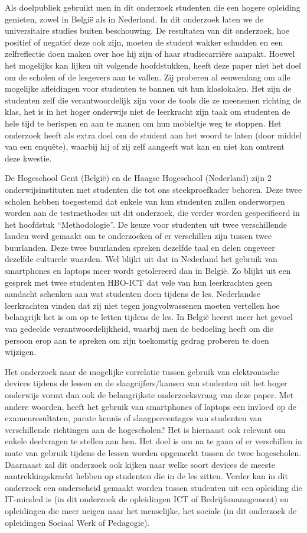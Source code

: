 Als doelpubliek gebruikt men in dit onderzoek studenten die een hogere opleiding genieten, zowel in België als in Nederland. In dit onderzoek laten we de universitaire studies buiten beschouwing. De resultaten van dit onderzoek, hoe positief of negatief deze ook zijn, moeten de student wakker schudden en een zelfreflectie doen maken over hoe hij zijn of haar studiecarrière aanpakt. Hoewel het mogelijks kan lijken uit volgende hoofdstukken, heeft deze paper niet het doel om de scholen of de lesgevers aan te vallen. Zij proberen al eeuwenlang om alle mogelijke afleidingen voor studenten te bannen uit hun klaslokalen. Het zijn de studenten zelf die verantwoordelijk zijn voor de tools die ze meenemen richting de klas, het is in het hoger onderwijs niet de leerkracht zijn taak om studenten de hele tijd te berispen en aan te manen om hun mobieltje weg te stoppen. Het onderzoek heeft als extra doel om de student aan het woord te laten (door middel van een enquête), waarbij hij of zij zelf aangeeft wat kan en niet kan omtrent deze kwestie.

De Hogeschool Gent (België) en de Haagse Hogeschool (Nederland) zijn 2 onderwijsinstituten met studenten die tot ons steekproefkader behoren. Deze twee scholen hebben toegestemd dat enkele van hun studenten zullen onderworpen worden aan de testmethodes uit dit onderzoek, die verder worden gespecifieerd in het hoofdstuk “Methodologie”. De keuze voor studenten uit twee verschillende landen werd gemaakt om te onderzoeken of er verschillen zijn tussen twee buurlanden. Deze twee buurlanden spreken dezelfde taal en delen ongeveer dezelfde culturele waarden. Wel blijkt uit \textcite{VanGaalen2017} dat in Nederland het gebruik van smartphones en laptops meer wordt getolereerd dan in België. Zo blijkt uit een gesprek met twee studenten HBO-ICT dat vele van hun leerkrachten geen aandacht schenken aan wat studenten doen tijdens de les. Nederlandse leerkrachten vinden dat zij niet tegen jongvolwassenen moeten vertellen hoe belangrijk het is om op te letten tijdens de les. In België heerst meer het gevoel van gedeelde verantwoordelijkheid, waarbij men de bedoeling heeft om die persoon erop aan te spreken om zijn toekomstig gedrag proberen te doen wijzigen.

Het onderzoek naar de mogelijke correlatie tussen gebruik van elektronische devices tijdens de lessen en de slaagcijfers/kansen van studenten uit het hoger onderwijs vormt dan ook de belangrijkste onderzoeksvraag van deze paper. Met andere woorden, heeft het gebruik van smartphones of laptops een invloed op de examenresultaten, parate kennis of slaagpercentages van studenten van verschillende richtingen aan de hogescholen? Het is hiernaast ook relevant om enkele deelvragen te stellen aan hen. Het doel is om na te gaan of er verschillen in mate van gebruik tijdens de lessen worden opgemerkt tussen de twee hogescholen. Daarnaast zal dit onderzoek ook kijken naar welke soort devices de meeste aantrekkingskracht hebben op studenten die in de les zitten. Verder kan in dit onderzoek een onderscheid gemaakt worden tussen studenten uit een opleiding die IT-minded is (in dit onderzoek de opleidingen ICT of Bedrijfsmanagement) en opleidingen die meer neigen naar het menselijke, het sociale (in dit onderzoek de opleidingen Sociaal Werk of Pedagogie).

